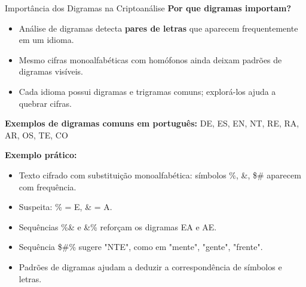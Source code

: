 \begin{frame}{Importância dos Digramas na Criptoanálise}
\textbf{Por que digramas importam?}  
\begin{itemize}
    \item Análise de digramas detecta \textbf{pares de letras} que aparecem frequentemente em um idioma.  
    \item Mesmo cifras monoalfabéticas com homófonos ainda deixam padrões de digramas visíveis.  
    \item Cada idioma possui digramas e trigramas comuns; explorá-los ajuda a quebrar cifras.
\end{itemize}

\medskip
\textbf{Exemplos de digramas comuns em português:} DE, ES, EN, NT, RE, RA, AR, OS, TE, CO

\medskip
\textbf{Exemplo prático:}  
\begin{itemize}
    \item Texto cifrado com substituição monoalfabética: símbolos \%, \&, \$\# aparecem com frequência.  
    \item Suspeita: \% = E, \& = A.  
    \item Sequências \%\& e \&\% reforçam os digramas EA e AE.  
    \item Sequência \$\#\% sugere "NTE", como em "mente", "gente", "frente".  
    \item Padrões de digramas ajudam a deduzir a correspondência de símbolos e letras.
\end{itemize}



\end{frame}

